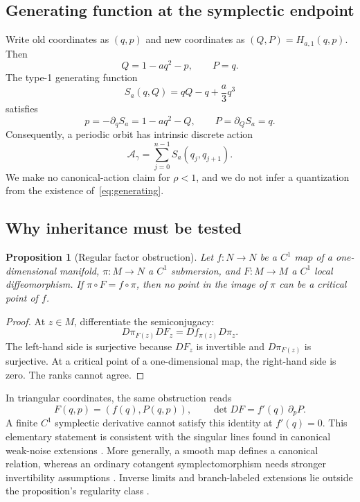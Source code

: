 \documentclass[11pt]{article}
\newtheorem{proposition}{Proposition}
\begin{document}
\subsection{Generating function at the symplectic endpoint}

Write old coordinates as \((q,p)\) and new coordinates as
\((Q,P)=H_{a,1}(q,p)\). Then
\[
 Q=1-aq^2-p,\qquad P=q.
\]
The type-1 generating function
\begin{equation}
 S_a(q,Q)=qQ-q+\frac{a}{3}q^3
\label{eq:generating}
\end{equation}
satisfies
\[
 p=-\partial_qS_a=1-aq^2-Q,\qquad P=\partial_QS_a=q.
\]
Consequently, a periodic orbit has intrinsic discrete action
\[
 \mathcal A_\gamma=\sum_{j=0}^{n-1}S_a(q_j,q_{j+1}).
\]
We make no canonical-action claim for \(\rho<1\), and we do not infer a
quantization from the existence of~\eqref{eq:generating}.

\subsection{Why inheritance must be tested}

\begin{proposition}[Regular factor obstruction]
\label{prop:rank}
Let \(f:N\to N\) be a \(C^1\) map of a one-dimensional manifold,
\(\pi:M\to N\) a \(C^1\) submersion, and \(F:M\to M\) a \(C^1\) local
diffeomorphism. If \(\pi\circ F=f\circ\pi\), then no point in the image of
\(\pi\) can be a critical point of \(f\).
\end{proposition}

\begin{proof}
At \(z\in M\), differentiate the semiconjugacy:
\[
 D\pi_{F(z)}DF_z=Df_{\pi(z)}D\pi_z.
\]
The left-hand side is surjective because \(DF_z\) is invertible and
\(D\pi_{F(z)}\) is surjective. At a critical point of a one-dimensional
map, the right-hand side is zero. The ranks cannot agree.
\end{proof}

In triangular coordinates, the same obstruction reads
\[
 F(q,p)=(f(q),P(q,p)),\qquad \det DF=f'(q)\,\partial_pP.
\]
A finite \(C^1\) symplectic derivative cannot satisfy this identity at
\(f'(q)=0\). This elementary statement is consistent with the singular
lines found in canonical weak-noise extensions
\citep{fogedby2005weak,demaeyer2009escape}. More generally, a smooth map
defines a canonical relation, whereas an ordinary cotangent
symplectomorphism needs stronger invertibility assumptions
\citep{cattaneo2010microgeometry,weinstein2010categories}. Inverse limits
and branch-labeled extensions lie outside the proposition's regularity class
\citep{berger2013inverse}.
\end{document}
